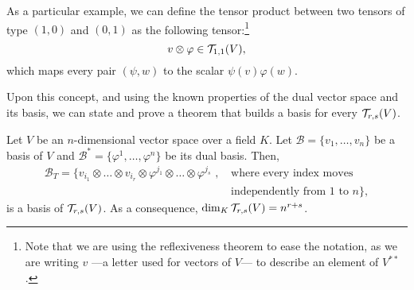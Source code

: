 As a particular example, we can define the tensor product between two tensors of type $(1,0)$ and $(0,1)$ as the following tensor:\footnote{Note that we are using the reflexiveness theorem to ease the notation, as we are writing $v$ ---a letter used for vectors of $V$--- to describe an element of $V^{**}$.}
\[
	v \otimes \varphi \in {\mathcal T}_{1,1}(V),
\]
which maps every pair $(\psi, w)$ to the scalar $\psi(v)\varphi(w)$.

Upon this concept, and using the known properties of the dual vector space and its basis, we can state and prove a theorem that builds a basis for every ${\mathcal T}_{r,s}(V)$.

\begin{theorem}
	Let $V$ be an $n$-dimensional vector space over a field $K$. Let $\mathcal{B} = \{v_1, \dots, v_n\}$ be a basis of $V$ and $\mathcal{B^*} = \{\varphi^1, \dots, \varphi^n\}$ be  its dual basis. Then,
	\begin{align*}
		\mathcal{B}_T = \{v_{i_1} \otimes \dots \otimes v_{i_r} \otimes \varphi^{j_1} \otimes \dots \otimes \varphi^{j_s} \textrm{ , } &\textrm{where every index moves} \\
		&\textrm{independently from $1$ to $n$}\},
	\end{align*}
	is a basis of ${\mathcal T}_{r,s}(V)$. As a consequence, $\dim_K{\mathcal T}_{r,s}(V) = n^{r+s}$.
\end{theorem}

